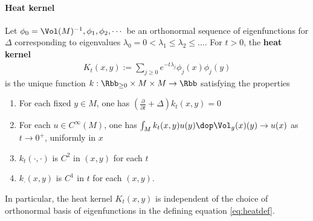 \paragraph{Heat kernel}
Let $\phi_0=\Vol(M)^{-1},\phi_1,\phi_2,\cdots$ be an orthonormal sequence of eigenfunctions for $\Delta$ corresponding to eigenvalues $\lambda_0=0 <\lambda_1 \leq \lambda_2 \leq \dots$. For $t >0$, the \textbf{heat kernel}
\begin{align}\label{eq:heatdef}
    K_t(x,y):= \sum_{j\geq 0} e^{-t\lambda_j} \phi_j(x)\phi_j(y)
\end{align}
is the unique function $k:\Rbb_{\geq 0} \times M \times M \to \Rbb$ satisfying the properties
\begin{enumerate}
    \item For each fixed $y\in M$, one has $\left(\frac{\partial}{\partial t} + \Delta \right)k_t(x,y) = 0$
    \item For each $u\in C^\infty(M)$, one has $ \int_M k_t(x,y) u(y)  \dop \Vol_g (x)(y) \to u(x)$  as $t \to 0^+$, uniformly in $x$
    \item $k_t(\cdot,\cdot)$ is $C^2$ in $(x,y)$ for each $t$
    \item $k_\cdot( x,y)$ is $C^1$  in $t$ for each $(x,y)$.
\end{enumerate}
In particular, the heat kernel $K_t(x,y)$ is independent of the choice of orthonormal basis of eigenfunctions in the defining equation \ref{eq:heatdef}.

